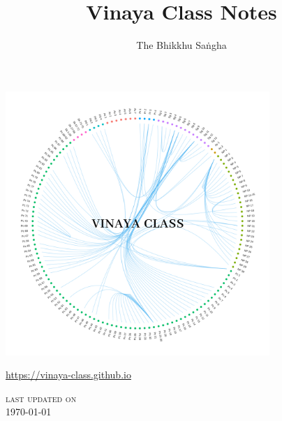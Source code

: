 \documentclass[11pt]{memoir}
\title{Vinaya Class Notes}
\author{The Bhikkhu Saṅgha}
\begin{document}
\frontmatter

\vspace*{-2cm}

{\centering%

\includegraphics[width=10cm]{../../src/includes/figures/vinaya-class-title-300dpi.png}

\href{https://vinaya-class.github.io}{https://vinaya-class.github.io}

{\scshape\small last updated on}\\
\today

}

\tableofcontents*



\mainmatter



























\backmatter





% 
\end{document}
